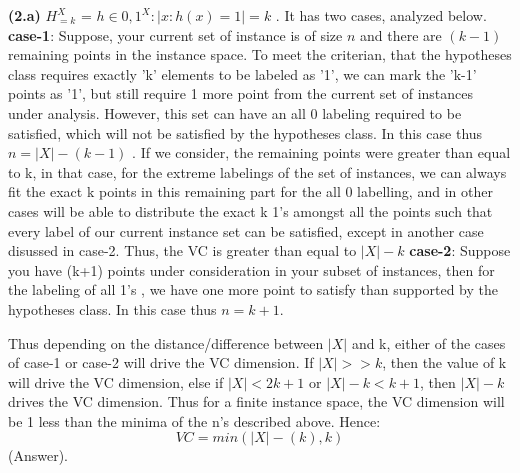 \documentclass{article}
\renewcommand\part[1]{\vspace{.10in}\textbf{(#1)}}
\begin{document}
  \part{2.a} 
    $H_{=k}^X$ = ${h \in {0,1}^X : |{x:h(x)=1}| = k}$ . It has two cases, analyzed below. \newline
    \textbf {case-1}: Suppose, your current set of instance is of size $n$ and there are $(k-1)$ remaining points in the instance space. To meet the criterian, that the hypotheses class requires exactly 'k' elements to be labeled as '1', we can mark the 'k-1' points as '1', but still require 1 more point from the current set of instances under analysis. However, this set can have an all 0 labeling required to be satisfied, which will not be satisfied by the hypotheses class. In this case thus $n = |X| - (k-1)$ . If we consider, the remaining points were greater than equal to k, in that case, for the extreme labelings of the set of instances, we can always fit the exact k points in this remaining part for the all 0 labelling, and in other cases will be able to distribute the exact k 1's amongst all the points such that every label of our current instance set can be satisfied, except in another case disussed in case-2. Thus, the VC is greater than equal to $|X| - k$ \newline
    \textbf {case-2}: Suppose you have (k+1) points under consideration in your subset of instances, then for the labeling of all 1's , we have one more point to satisfy than supported by the hypotheses class. In this case thus $n = k+1$. \newline

    Thus depending on the distance/difference between $|X|$ and k, either of the cases of case-1 or case-2 will drive the VC dimension. If $|X| >> k$, then the value of k will drive the VC dimension, else if $|X| < 2k+1$ or $|X| - k < k+1$, then $|X|-k$ drives the VC dimension.
    Thus for a finite instance space, the VC dimension will be 1 less than the minima of the n's described above. Hence: \newline
    \[ VC = min(|X| - (k) , k)\]
    (Answer).
    
\end{document}
